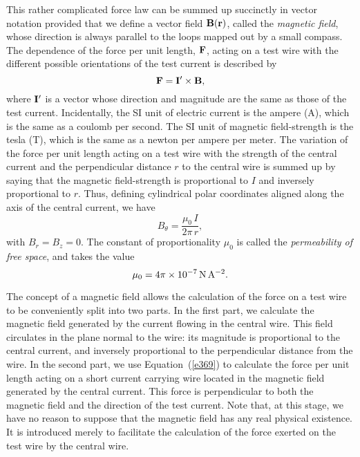 This rather complicated force law can be summed up succinctly in vector notation
provided that we define a vector field ${\bf B}({\bf r})$, called the {\em magnetic field}, 
whose direction is always parallel to the loops mapped out by a small
  compass. The dependence of the force per unit length, ${\bf F}$, acting on a
test wire with the different 
possible orientations of the test current is described  by 
\begin{equation}
{\bf F} = {\bf I}' \times{\bf B},\label{e369}
\end{equation}
where ${\bf I}'$ is a vector whose direction and magnitude are the same as those
of the test current. Incidentally, the SI unit of electric current is the
ampere (A), which is the same as a coulomb per second.
The SI unit of magnetic field-strength is the tesla (T), which is the
same as a newton per ampere per meter.
The variation of the force per unit length acting on
a test wire with the strength of the 
central current and the perpendicular distance $r$ to the central wire is 
summed up by saying that the magnetic field-strength is proportional to $I$ and
inversely proportional to $r$. Thus, defining cylindrical
polar coordinates aligned along the
axis of the central current, we have
\begin{equation}
B_\theta = \frac{\mu_0\,I}
{2 \pi\, r},
\end{equation}
with $B_r=B_z = 0$. The constant of proportionality $\mu_0$ is called the
{\em permeability of free space}, and takes the value
\begin{equation}
\mu_0 = 4\pi \times 10^{-7}\,{\rm N\,A^{-2}}.
\end{equation}

The concept of a magnetic field allows the calculation of the force on a test
wire to be conveniently split into two parts. In the first part, we calculate the
magnetic field generated by the current flowing in the central wire. This field
circulates  in the plane normal to the wire: its magnitude is
proportional to the central current, and inversely proportional to the  perpendicular
distance from the wire. In the second part, we use
Equation~(\ref{e369}) to calculate the force per unit
length acting on a
short current carrying wire located in the magnetic field 
generated by the central current.
This force is perpendicular to both the magnetic field and the direction of the
test current. Note that, at this stage, we have no reason to suppose that the magnetic
field has any real physical existence. It is introduced merely to facilitate the calculation
of the  force exerted  on  the test wire by the central wire.

